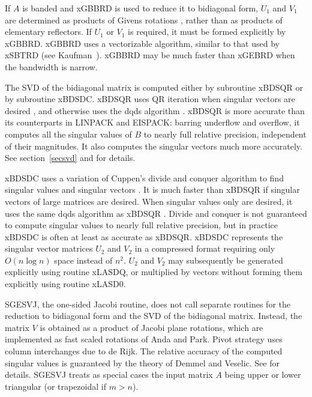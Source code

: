 If $A$ is banded and xGBBRD is used to reduce it to bidiagonal form,
$U_1$ and $V_1$ are determined as products of Givens rotations
, rather than
as products of elementary reflectors. If $U_1$ or $V_1$ is required, it
must be formed explicitly by xGBBRD. xGBBRD uses a vectorizable
algorithm, similar to that used by xSBTRD (see Kaufman~\cite{vbandr}).
xGBBRD may be much faster than xGEBRD when the bandwidth is narrow.

The SVD of the bidiagonal matrix is computed either by subroutine
xBDSQR
or by subroutine
xBDSDC.
xBDSQR uses QR iteration when singular vectors are desired
\cite{demmelkahan,deiftdemmellitomei},
and otherwise uses the dqds algorithm \cite{fernandoparlett}.
xBDSQR is more accurate than its counterparts in LINPACK and EISPACK:
barring underflow and overflow, it computes all the singular values of
$B$ to nearly full relative precision, independent of their magnitudes.
It also computes the singular vectors much more accurately. See
section~\ref{secsvd} and
\cite{demmelkahan,deiftdemmellitomei,fernandoparlett} for details.

xBDSDC 
uses a variation of Cuppen's divide and conquer algorithm to find
singular values and singular vectors \cite{jessupsorensen,gueisenstat3}.
It is much faster than xBDSQR if singular vectors of large matrices are desired.
When singular values only are desired, it uses the same dqds algorithm as xBDSQR
\cite{fernandoparlett}.
Divide and conquer is not guaranteed to compute singular values to nearly
full relative precision, but in practice xBDSDC is often at least as
accurate as xBDSQR.
xBDSDC represents the singular vector matrices $U_2$ and $V_2$
in a compressed format requiring only $O(n \log n)$ space instead
of $n^2$. $U_2$ and $V_2$ may subsequently be generated explicitly
using routine xLASDQ, or multiplied by vectors without forming
them explicitly using routine xLASD0.

SGESVJ, the one-sided Jacobi routine,
does not call separate routines for the reduction
to bidiagonal form and the SVD of the bidiagonal matrix. Instead, the matrix $V$ is
obtained as a product of Jacobi plane rotations, which are implemented as fast scaled
rotations of Anda and Park. Pivot strategy uses column interchanges due to de Rijk.
The relative accuracy of the computed singular values is guaranteed by the theory
of Demmel and Veselic.
See \cite{andapark94,derijk,Demmelveselic} for details.
SGESVJ treats as special cases the input matrix $A$ being upper or
lower triangular (or trapezoidal if $m > n$).

